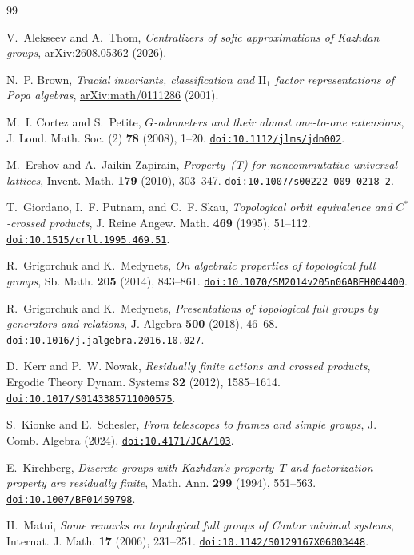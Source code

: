 \documentclass[11pt]{amsart}
\newcommand{\doi}[1]{\href{https://doi.org/#1}{\nolinkurl{doi:#1}}}
\begin{document}
\begin{thebibliography}{99}

V.~Alekseev and A.~Thom,
\emph{Centralizers of sofic approximations of Kazhdan groups},
\href{https://arxiv.org/abs/2608.05362}{arXiv:2608.05362} (2026).

N.~P. Brown, \emph{Tracial invariants, classification and
$\mathrm{II}_1$ factor representations of Popa algebras},
\href{https://arxiv.org/abs/math/0111286}{arXiv:math/0111286} (2001).

M.~I. Cortez and S.~Petite,
\emph{$G$-odometers and their almost one-to-one extensions},
J. Lond. Math. Soc. (2) \textbf{78} (2008), 1--20.
\doi{10.1112/jlms/jdn002}.

M.~Ershov and A.~Jaikin-Zapirain,
\emph{Property~\textup{(T)} for noncommutative universal lattices},
Invent. Math. \textbf{179} (2010), 303--347.
\doi{10.1007/s00222-009-0218-2}.

T.~Giordano, I.~F. Putnam, and C.~F. Skau,
\emph{Topological orbit equivalence and $C^*$-crossed products},
J. Reine Angew. Math. \textbf{469} (1995), 51--112.
\doi{10.1515/crll.1995.469.51}.

R.~Grigorchuk and K.~Medynets,
\emph{On algebraic properties of topological full groups},
Sb. Math. \textbf{205} (2014), 843--861.
\doi{10.1070/SM2014v205n06ABEH004400}.

R.~Grigorchuk and K.~Medynets,
\emph{Presentations of topological full groups by generators and
relations}, J. Algebra \textbf{500} (2018), 46--68.
\doi{10.1016/j.jalgebra.2016.10.027}.

D.~Kerr and P.~W. Nowak,
\emph{Residually finite actions and crossed products},
Ergodic Theory Dynam. Systems \textbf{32} (2012), 1585--1614.
\doi{10.1017/S0143385711000575}.

S.~Kionke and E.~Schesler,
\emph{From telescopes to frames and simple groups},
J. Comb. Algebra (2024). \doi{10.4171/JCA/103}.

E.~Kirchberg, \emph{Discrete groups with Kazhdan's property~$T$ and
factorization property are residually finite},
Math. Ann. \textbf{299} (1994), 551--563.
\doi{10.1007/BF01459798}.

H.~Matui, \emph{Some remarks on topological full groups of Cantor
minimal systems}, Internat. J. Math. \textbf{17} (2006), 231--251.
\doi{10.1142/S0129167X06003448}.


\end{thebibliography}
\end{document}
